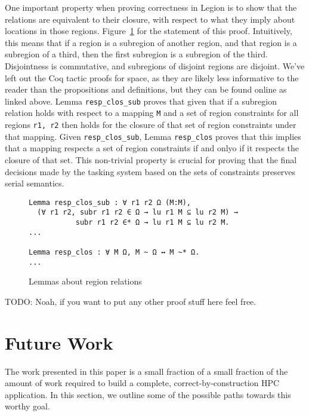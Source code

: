 \documentclass[sigconf]{acmart}
\begin{document}
One important property when proving correctness in Legion is to show that the
relations are equivalent to their closure, with respect to what they imply
about locations in those regions.  Figure~\ref{regionrelproof} for the
statement of this proof. Intuitively, this means that if a region is a
subregion of another region, and that region is a subregion of a third, then
the first subregion is a subregion of the third. Disjointness is commutative, 
and subregions of disjoint regions are disjoint. We've left out the Coq tactic
proofs for space, as they are likely less informative to the reader than the
propositions and definitions, but they can be found online as linked above. 
Lemma \texttt{resp\_clos\_sub} proves that given that if a subregion relation
holds with respect to a mapping \texttt{M} and a set of region constraints
 for all regions \texttt{r1, r2} then holds for the closure of that
set of region constraints under that mapping. Given \texttt{resp\_clos\_sub}, 
Lemma \texttt{resp\_clos} proves that this implies that a mapping respects
a set of region constraints if and onlyo if it respects the closure of that
set. This non-trivial property is crucial for proving that the final decisions 
made by the tasking system based on the sets of constraints preserves 
serial semantics. 

\begin{figure}
\centering
\begin{BVerbatim}
Lemma resp_clos_sub : ∀ r1 r2 Ω (M:M), 
  (∀ r1 r2, subr r1 r2 ∈ Ω → lu r1 M ⊆ lu r2 M) → 
           subr r1 r2 ∈* Ω → lu r1 M ⊆ lu r2 M.
...

Lemma resp_clos : ∀ M Ω, M ~ Ω ↔ M ~* Ω.
...
\end{BVerbatim}
\caption{Lemmas about region relations}
\label{regionrelproof}
\end{figure}

TODO: Noah, if you want to put any other proof stuff here feel free. 

\section{Future Work}

The work presented in this paper is a small fraction of a small fraction of the
amount of work required to build a complete, correct-by-construction HPC
application. In this section, we outline some of the possible paths towards
this worthy goal. 
\end{document}
